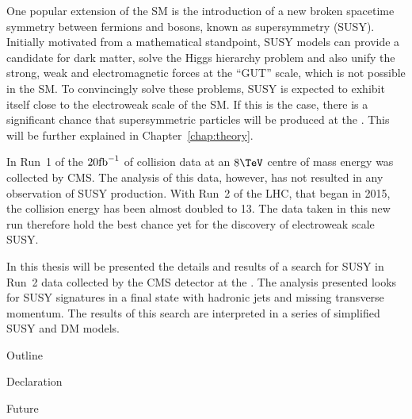 One popular extension of the SM is the introduction of a new broken
spacetime symmetry between fermions and bosons, known as supersymmetry
(SUSY). Initially motivated from a mathematical standpoint, SUSY
models can provide a candidate for dark matter, solve the Higgs
hierarchy problem and also unify the strong, weak and electromagnetic
forces at the ``GUT'' scale, which is not possible in the SM. To
convincingly solve these problems, SUSY is expected to exhibit itself
close to the electroweak scale of the SM. If this is the case, there
is a significant chance that supersymmetric particles will be produced
at the \LHC. This will be further explained in
Chapter~\ref{chap:theory}.

In Run~1 of the \LHC $20\text{fb}^{-1}$ of collision data at an $8\tev$ centre of
mass energy was collected by CMS. The analysis of this data, however,
has not resulted in any observation of SUSY production. With Run~2 of
the LHC, that began in 2015, the collision energy has been almost
doubled to 13\tev. The data taken in this new run therefore hold the
best chance yet for the discovery of electroweak scale SUSY.

In this thesis will be presented the details and results of a search
for SUSY in Run~2 data collected by the CMS detector at the \LHC.  The
analysis presented looks for SUSY signatures in a final state with
hadronic jets and missing transverse momentum. The results of this
search are interpreted in a series of simplified SUSY and DM models.

Outline 

Declaration

Future

%
